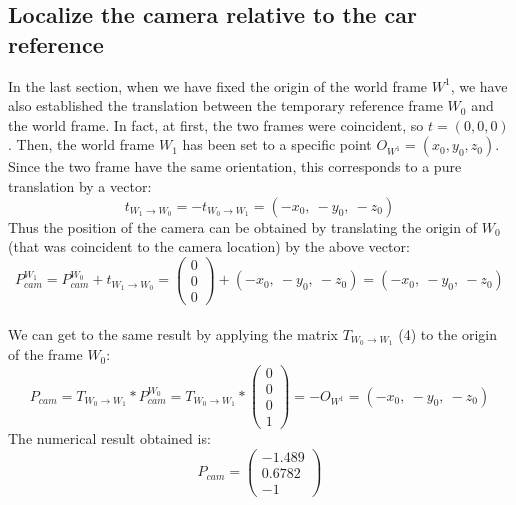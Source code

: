 \documentclass{article}
\begin{document}
\subsection{Localize the camera relative to the car reference}
In the last section, when we have fixed the origin of the world frame $W^1$, we have also established the translation between the temporary reference frame $W_0$ and the world frame. In fact, at first, the two frames were coincident, so $t=(0, 0, 0)$. Then, the world frame $W_1$ has been set to a specific point $O_{W^1}=(x_0, y_0, z_0)$. Since the two frame have the same orientation, this corresponds to a pure translation by a vector:
$$ t_{W_1 \rightarrow W_0} = -t_{W_0 \rightarrow W_1} = (-x_0, \: -y_0, \: -z_0) $$
Thus the position of the camera can be obtained by translating the origin of $W_0$ (that was coincident to the camera location) by the above vector:
$$ P_{cam}^{W_1} = P_{cam}^{W_0} + t_{W_1 \rightarrow W_0} = \begin{pmatrix}
0 \\ 0 \\ 0
\end{pmatrix} + (-x_0, \: -y_0, \: -z_0) = (-x_0, \: -y_0, \: -z_0) $$
\\
We can get to the same result by applying the matrix $T_{W_0 \rightarrow W_1}$ (4) to the origin of the frame $W_0$:
$$ P_{cam} = T_{W_0 \rightarrow W_1} * P_{cam}^{W_0} = T_{W_0 \rightarrow W_1} * \begin{pmatrix}
0 \\ 0 \\ 0 \\ 1
\end{pmatrix} = -O_{W^1} =  (-x_0, \: -y_0, \: -z_0) $$
The numerical result obtained is:
$$ P_{cam} = \begin{pmatrix}
-1.489 \\ 0.6782 \\ -1
\end{pmatrix} $$
\end{document}
